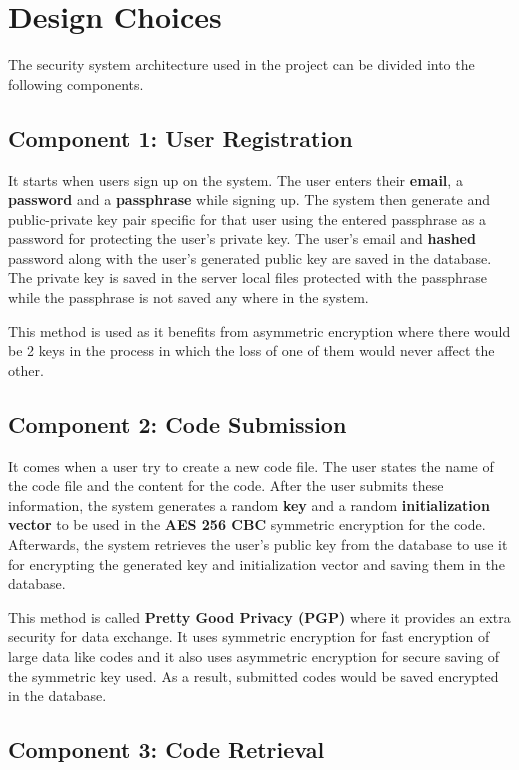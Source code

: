 \chapter{Design Choices}

The security system architecture used in the project can be divided into the following components.

\section{Component 1: User Registration}

It starts when users sign up on the system. The user enters their \textbf{email}, a \textbf{password} and a \textbf{passphrase} while signing up. The system then generate and public-private key pair specific for that user using the entered passphrase as a password for protecting the user's private key. The user's email and \textbf{hashed} password along with the user's generated public key are saved in the database. The private key is saved in the server local files protected with the passphrase while the passphrase is not saved any where in the system.

This method is used as it benefits from asymmetric encryption where there would be 2 keys in the process in which the loss of one of them would never affect the other.

\section{Component 2: Code Submission}

It comes when a user try to create a new code file. The user states the name of the code file and the content for the code. After the user submits these information, the system generates a random \textbf{key} and a random \textbf{initialization vector} to be used in the \textbf{AES 256 CBC} symmetric encryption for the code. Afterwards, the system retrieves the user's public key from the database to use it for encrypting the generated key and initialization vector and saving them in the database.

This method is called \textbf{Pretty Good Privacy (PGP)} where it provides an extra security for data exchange. It uses symmetric encryption for fast encryption of large data like codes and it also uses asymmetric encryption for secure saving of the symmetric key used. As a result, submitted codes would be saved encrypted in the database.

\section{Component 3: Code Retrieval}

